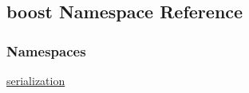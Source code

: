 \hypertarget{namespaceboost}{}\subsection{boost Namespace Reference}
\label{namespaceboost}
\subsubsection*{Namespaces}
\begin{DoxyCompactItemize}
\item 
 \hyperlink{namespaceboost_1_1serialization}{serialization}
\end{DoxyCompactItemize}
